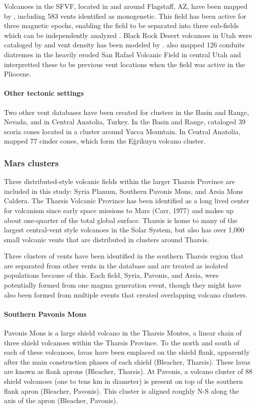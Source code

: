 \documentclass[12pt,letter]{article}
\begin{document}
Volcanoes in the SFVF, located in and around Flagstaff, AZ, have been mapped by \citet{Harburger2014}, including 583 vents identified as monogenetic. This field has been active for three magnetic epochs, enabling the field to be separated into three sub-fields which can be independently analyzed \citep{Tanaka1986}. Black Rock Desert volcanoes in Utah were cataloged by \citet{Hintz2008} and vent density has been modeled by \citet{Kiyosugi2012}. \citet{Kiyosugi2012} also mapped 126 conduits diatremes in the heavily eroded San Rafael Volcanic Field in central Utah and interpretted these to be previous vent locations when the field was active in the Pliocene.

\paragraph{Other tectonic settings} Two other vent databases have been created for clusters in the Basin and Range, Nevada, and in Central Anatolia, Turkey. In the Basin and Range, \citet{Connor1995} cataloged 39 scoria cones located in a cluster around Yucca Mountain. In Central Anatolia, \citet{Usular2015} mapped 77 cinder cones, which form the E\u{g}rikuyu volcano cluster.


\subsubsection{Mars clusters}
Three distributed-style volcanic fields within the larger Tharsis Province are included in this study: Syria Planum, Southern Pavonis Mons, and Arsia Mons Caldera. The Tharsis Volcanic Province has  been identified as a long lived center for volcanism since early space missions to Mars (Carr, 1977) and makes up about one-quarter of the total global surface. Tharsis is home to many of the largest central-vent style volcanoes in the Solar System, but also has over 1,000 small volcanic vents that are distributed in clusters around Tharsis.

Three clusters of vents have been identified in the southern Tharsis region that are separated from other vents in the database and are treated as isolated populations because of this. Each field, Syria, Pavonis, and Arsia, were potentially formed from one magma generation event, though they might have also been formed from multiple events that created overlapping volcano clusters.

\paragraph{Southern Pavonis Mons}
Pavonis Mons is a large shield volcano in the Tharsis Montes, a linear chain of three shield volcanoes within the Tharsis Province. To the north and south of each of these volcanoes, lavas have been emplaced on the shield flank, apparently after the main construction phases of each shield (Bleacher, Tharsis). These lavas are known as flank aprons (Bleacher, Tharsis). At Pavonis, a volcano cluster of 88 shield volcanoes (one to tens km in diameter) is present on top of the southern flank apron (Bleacher, Pavonis). This cluster is aligned roughly N-S along the axis of the apron (Bleacher, Pavonis).
\end{document}

